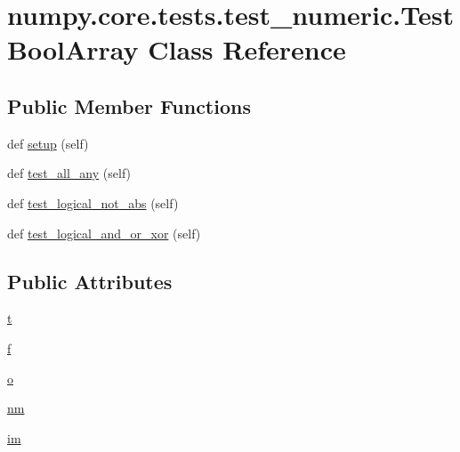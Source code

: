 \hypertarget{classnumpy_1_1core_1_1tests_1_1test__numeric_1_1TestBoolArray}{}\section{numpy.\+core.\+tests.\+test\+\_\+numeric.\+Test\+Bool\+Array Class Reference}
\label{classnumpy_1_1core_1_1tests_1_1test__numeric_1_1TestBoolArray}
\subsection*{Public Member Functions}
\begin{DoxyCompactItemize}
\item 
def \hyperlink{classnumpy_1_1core_1_1tests_1_1test__numeric_1_1TestBoolArray_a5fb37de1b394bf1b17287643ec7250bd}{setup} (self)
\item 
def \hyperlink{classnumpy_1_1core_1_1tests_1_1test__numeric_1_1TestBoolArray_a5f1383af62d2f4d324847c6f192f0c8a}{test\+\_\+all\+\_\+any} (self)
\item 
def \hyperlink{classnumpy_1_1core_1_1tests_1_1test__numeric_1_1TestBoolArray_ab971aaf4ebfb66feac8f0619432e39d5}{test\+\_\+logical\+\_\+not\+\_\+abs} (self)
\item 
def \hyperlink{classnumpy_1_1core_1_1tests_1_1test__numeric_1_1TestBoolArray_a99d52b0589447ec54c0ed805dbddfea0}{test\+\_\+logical\+\_\+and\+\_\+or\+\_\+xor} (self)
\end{DoxyCompactItemize}
\subsection*{Public Attributes}
\begin{DoxyCompactItemize}
\item 
\hyperlink{classnumpy_1_1core_1_1tests_1_1test__numeric_1_1TestBoolArray_a420fd674b400dc3bc6df929d96c0ccbd}{t}
\item 
\hyperlink{classnumpy_1_1core_1_1tests_1_1test__numeric_1_1TestBoolArray_a6534471527151dbc8236520e6c761f01}{f}
\item 
\hyperlink{classnumpy_1_1core_1_1tests_1_1test__numeric_1_1TestBoolArray_aaadb5fbffa3c0a4d95cc034fbce6e6e4}{o}
\item 
\hyperlink{classnumpy_1_1core_1_1tests_1_1test__numeric_1_1TestBoolArray_a61584bac2c323c3a2a3915812e32e05b}{nm}
\item 
\hyperlink{classnumpy_1_1core_1_1tests_1_1test__numeric_1_1TestBoolArray_a11b9eb3e46c1054ee78745091308c2f0}{im}
\end{DoxyCompactItemize}


